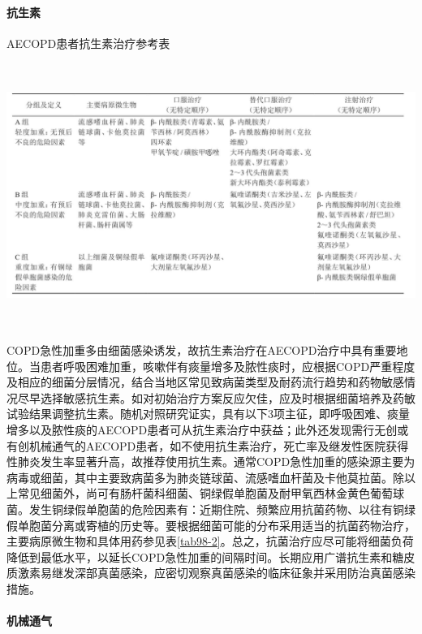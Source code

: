 \paragraph{抗生素}

\begin{table}[htbp]
\centering
\caption{AECOPD患者抗生素治疗参考表}
\label{tab98-2}
\includegraphics[width=6.73958in,height=3.39583in]{./images/Image00400.jpg}
\end{table}

COPD急性加重多由细菌感染诱发，故抗生素治疗在AECOPD治疗中具有重要地位。当患者呼吸困难加重，咳嗽伴有痰量增多及脓性痰时，应根据COPD严重程度及相应的细菌分层情况，结合当地区常见致病菌类型及耐药流行趋势和药物敏感情况尽早选择敏感抗生素。如对初始治疗方案反应欠佳，应及时根据细菌培养及药敏试验结果调整抗生素。随机对照研究证实，具有以下3项主征，即呼吸困难、痰量增多以及脓性痰的AECOPD患者可从抗生素治疗中获益；此外还发现需行无创或有创机械通气的AECOPD患者，如不使用抗生素治疗，死亡率及继发性医院获得性肺炎发生率显著升高，故推荐使用抗生素。通常COPD急性加重的感染源主要为病毒或细菌，其中主要致病菌多为肺炎链球菌、流感嗜血杆菌及卡他莫拉菌。除以上常见细菌外，尚可有肠杆菌科细菌、铜绿假单胞菌及耐甲氧西林金黄色葡萄球菌。发生铜绿假单胞菌的危险因素有：近期住院、频繁应用抗菌药物、以往有铜绿假单胞菌分离或寄植的历史等。要根据细菌可能的分布采用适当的抗菌药物治疗，主要病原微生物和具体用药参见表\ref{tab98-2}。总之，抗菌治疗应尽可能将细菌负荷降低到最低水平，以延长COPD急性加重的间隔时间。长期应用广谱抗生素和糖皮质激素易继发深部真菌感染，应密切观察真菌感染的临床征象并采用防治真菌感染措施。

\paragraph{机械通气}

